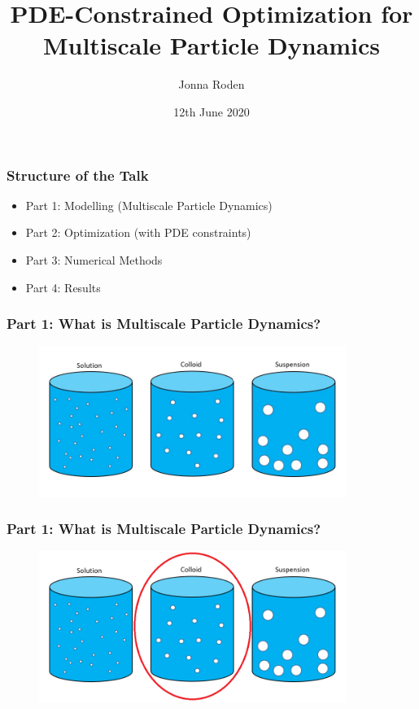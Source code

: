\documentclass[aspectratio=169,xcolor=dvipsnames]{beamer}
\begin{document}
\title[]{PDE-Constrained Optimization for Multiscale Particle Dynamics}
\author[Jonna Roden]{Jonna Roden}
\date{12th June 2020}

\begin{frame}
\titlepage
\end{frame}
 
 
\begin{frame}
	\frametitle{Structure of the Talk}
	 
	 \begin{itemize}
	 	\item Part 1: Modelling (Multiscale Particle Dynamics)
	 	\item Part 2: Optimization (with PDE constraints)
	 	\item Part 3: Numerical Methods 
	 	\item Part 4: Results
	 \end{itemize}
\end{frame}
\begin{frame}
	\frametitle{Part 1: What is Multiscale Particle Dynamics?}
	
	\begin{figure}
		\includegraphics[width=10cm]{Particles1.jpg}
	\end{figure}
	
\end{frame}

\begin{frame}
	\frametitle{Part 1: What is Multiscale Particle Dynamics?}
	
	\begin{figure}
		\includegraphics[width=10cm]{Particles2.png}
	\end{figure}

\end{frame}
\end{document}
